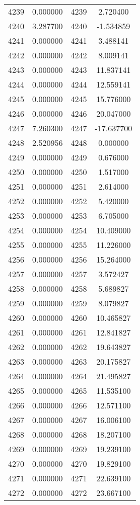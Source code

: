 \documentclass[12pt]{article}
\begin{document}
\begin{longtable}{@{}cccc@{}}
4239 & 0.000000 & 4239 & 2.720400 \\
4240 & 3.287700 & 4240 & -1.534859 \\
4241 & 0.000000 & 4241 & 3.488141 \\
4242 & 0.000000 & 4242 & 8.009141 \\
4243 & 0.000000 & 4243 & 11.837141 \\
4244 & 0.000000 & 4244 & 12.559141 \\
4245 & 0.000000 & 4245 & 15.776000 \\
4246 & 0.000000 & 4246 & 20.047000 \\
4247 & 7.260300 & 4247 & -17.637700 \\
4248 & 2.520956 & 4248 & 0.000000 \\
4249 & 0.000000 & 4249 & 0.676000 \\
4250 & 0.000000 & 4250 & 1.517000 \\
4251 & 0.000000 & 4251 & 2.614000 \\
4252 & 0.000000 & 4252 & 5.420000 \\
4253 & 0.000000 & 4253 & 6.705000 \\
4254 & 0.000000 & 4254 & 10.409000 \\
4255 & 0.000000 & 4255 & 11.226000 \\
4256 & 0.000000 & 4256 & 15.264000 \\
4257 & 0.000000 & 4257 & 3.572427 \\
4258 & 0.000000 & 4258 & 5.689827 \\
4259 & 0.000000 & 4259 & 8.079827 \\
4260 & 0.000000 & 4260 & 10.465827 \\
4261 & 0.000000 & 4261 & 12.841827 \\
4262 & 0.000000 & 4262 & 19.643827 \\
4263 & 0.000000 & 4263 & 20.175827 \\
4264 & 0.000000 & 4264 & 21.495827 \\
4265 & 0.000000 & 4265 & 11.535100 \\
4266 & 0.000000 & 4266 & 12.571100 \\
4267 & 0.000000 & 4267 & 16.006100 \\
4268 & 0.000000 & 4268 & 18.207100 \\
4269 & 0.000000 & 4269 & 19.239100 \\
4270 & 0.000000 & 4270 & 19.829100 \\
4271 & 0.000000 & 4271 & 22.639100 \\
4272 & 0.000000 & 4272 & 23.667100 \\

\end{longtable}
\end{document}
